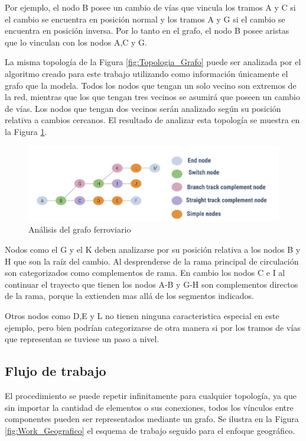		Por ejemplo, el nodo B posee un cambio de vías que vincula los tramos A y C si el cambio se encuentra en posición normal y los tramos A y G si el cambio se encuentra en posición inversa. Por lo tanto en el grafo, el nodo B posee aristas que lo vinculan con los nodos A,C y G.
		
		La misma topología de la Figura \ref{fig:Topologia_Grafo} puede ser analizada por el algoritmo creado para este trabajo utilizando como información únicamente el grafo que la modela. Todos los nodos que tengan un solo vecino son extremos de la red, mientras que los que tengan tres vecinos se asumirá que poseen un cambio de vías. Los nodos que tengan dos vecinos serán analizado según su posición relativa a cambios cercanos. El resultado de analizar esta topología se muestra en la Figura \ref{fig:Grafo_Analisis}.
	
		\begin{figure}[h]
		\centering
			\includegraphics[scale=.4]{./Figures/Grafo}
			\caption{Análisis del grafo ferroviario}
			\label{fig:Grafo_Analisis}
		\end{figure}
	
		Nodos como el G y el K deben analizarse por su posición relativa a los nodos B y H que son la raíz del cambio. Al desprenderse de la rama principal de circulación son categorizados como complementos de rama. En cambio los nodos C e I al continuar el trayecto que tienen los nodos A-B y G-H son complementos directos de la rama, porque la extienden mas allá de los segmentos indicados.
		
		Otros nodos como D,E y L no tienen ninguna caracteristica especial en este ejemplo, pero bien podrían categorizarse de otra manera si por los tramos de vías que representan se tuviese un paso a nivel.
	
		\subsection{Flujo de trabajo}
		
		El procedimiento se puede repetir infinitamente para cualquier topología, ya que sin importar la cantidad de elementos o sus conexiones, todos los vínculos entre componentes pueden ser representados mediante un grafo. Se ilustra en la Figura \ref{fig:Work_Geografico} el esquema de trabajo seguido para el enfoque geográfico.	
		
